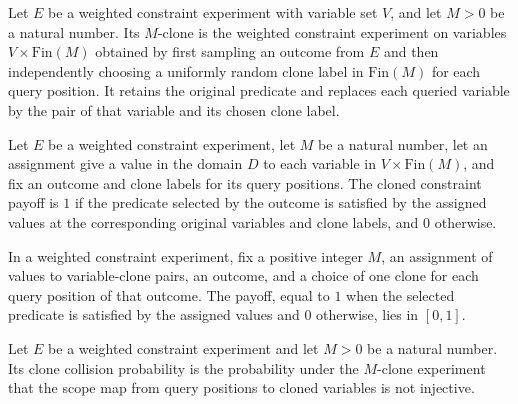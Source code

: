 \begin{definition}
\label{FABL.WeightedConstraintExperiment.clone}
\leanok
{}
Let $E$ be a weighted constraint experiment with variable set $V$, and let $M>0$ be a
natural number. Its $M$-clone is the weighted constraint experiment on variables
$V\times\text{Fin}(M)$ obtained by first sampling an outcome from $E$ and then
independently choosing a uniformly random clone label in $\text{Fin}(M)$ for each query
position. It retains the original predicate and replaces each queried variable by the
pair of that variable and its chosen clone label.
\end{definition}

\begin{definition}
\label{FABL.WeightedConstraintExperiment.clonePayoff}
\leanok
Let $E$ be a weighted constraint experiment, let $M$ be a natural number, let an
assignment give a value in the domain $D$ to each variable in $V\times\text{Fin}(M)$,
and fix an outcome and clone labels for its query positions. The cloned constraint
payoff is $1$ if the predicate selected by the outcome is satisfied by the assigned
values at the corresponding original variables and clone labels, and $0$ otherwise.
\end{definition}

\begin{theorem}
\label{FABL.WeightedConstraintExperiment.clonePayoff_mem_Icc}
\leanok
{}
In a weighted constraint experiment, fix a positive integer $M$, an assignment of values
to variable-clone pairs, an outcome, and a choice of one clone for each query position
of that outcome. The payoff, equal to $1$ when the selected predicate is satisfied by
the assigned values and $0$ otherwise, lies in $[0,1]$.
\end{theorem}

\begin{definition}
\label{FABL.WeightedConstraintExperiment.cloneCollisionProbability}
\leanok
{}
Let $E$ be a weighted constraint experiment and let $M>0$ be a natural number. Its clone
collision probability is the probability under the $M$-clone experiment that the scope
map from query positions to cloned variables is not injective.
\end{definition}


